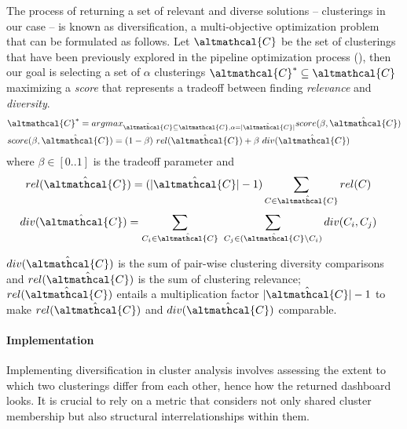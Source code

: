 The process of returning a set of relevant and diverse solutions -- clusterings in our case -- is known as diversification, a multi-objective optimization problem that can be formulated as follows.
%
Let $\altmathcal{C}$ be the set of clusterings that have been previously explored in the pipeline optimization process (), then our goal is selecting a set of $\alpha$ clusterings $\altmathcal{C}^* \subseteq \altmathcal{C}$ maximizing a \textit{score} that represents a tradeoff between finding \textit{relevance} and \textit{diversity}.
%
\begin{align}\label{def:score}
&\altmathcal{C}^* = argmax_{\hat{\altmathcal{C}} \subseteq \altmathcal{C}, \alpha=|\hat{\altmathcal{C}}|} score(\beta, \hat{\altmathcal{C}})\\
&score(\beta, \hat{\altmathcal{C}}) = (1-\beta)~rel(\hat{\altmathcal{C}}) + \beta~div(\hat{\altmathcal{C}})
\end{align}
where $\beta \in [0.. 1]$ is the tradeoff parameter and
\begin{align}
rel(\hat{\altmathcal{C}}) &= (|\hat{\altmathcal{C}}|-1)\sum_{C \in \hat{\altmathcal{C}}} rel(C)
\label{def:rel}
\end{align}
\begin{align}
div(\hat{\altmathcal{C}}) &= \sum_{C_i \in \hat{\altmathcal{C}}}~\sum_{C_j \in (\hat{\altmathcal{C}} \setminus C_i)} div(C_i, C_j)
\label{def:div}
\end{align}

\noindent $div(\hat{\altmathcal{C}})$ is the sum of pair-wise clustering diversity comparisons and $rel(\hat{\altmathcal{C}})$ is the sum of clustering relevance;
$rel(\hat{\altmathcal{C}})$ entails a multiplication factor $|\hat{\altmathcal{C}}|-1$ to make $rel(\hat{\altmathcal{C}})$ and $div(\hat{\altmathcal{C}})$ comparable.




\paragraph{Implementation}
Implementing diversification in cluster analysis involves assessing the extent to which two clusterings differ from each other, hence how the returned dashboard looks.
It is crucial to rely on a metric that considers not only shared cluster membership but also structural interrelationships within them.

